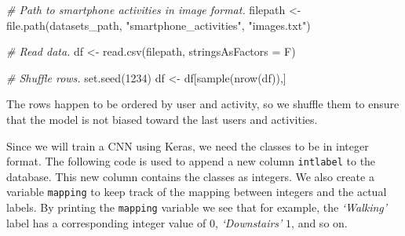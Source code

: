 \documentclass[
  11pt,
]{krantz}
\newenvironment{Shaded}{\begin{snugshade}}{\end{snugshade}}
\newcommand{\AttributeTok}[1]{\textcolor[rgb]{0.61,0.61,0.61}{#1}}
\newcommand{\CommentTok}[1]{\textcolor[rgb]{0.37,0.37,0.37}{\textit{#1}}}
\newcommand{\DecValTok}[1]{\textcolor[rgb]{0.06,0.06,0.06}{#1}}
\newcommand{\DocumentationTok}[1]{\textcolor[rgb]{0.37,0.37,0.37}{\textbf{\textit{#1}}}}
\newcommand{\FunctionTok}[1]{\textcolor[rgb]{0,0,0}{#1}}
\newcommand{\NormalTok}[1]{#1}
\newcommand{\OtherTok}[1]{\textcolor[rgb]{0.37,0.37,0.37}{#1}}
\newcommand{\SpecialCharTok}[1]{\textcolor[rgb]{0,0,0}{#1}}
\newcommand{\StringTok}[1]{\textcolor[rgb]{0.5,0.5,0.5}{#1}}
\begin{document}
\begin{Shaded}
\begin{Highlighting}[]
\CommentTok{\# Path to smartphone activities in image format.}
\NormalTok{filepath }\OtherTok{\textless{}{-}} \FunctionTok{file.path}\NormalTok{(datasets\_path,}
                      \StringTok{"smartphone\_activities"}\NormalTok{,}
                      \StringTok{"images.txt"}\NormalTok{)}

\CommentTok{\# Read data.}
\NormalTok{df }\OtherTok{\textless{}{-}} \FunctionTok{read.csv}\NormalTok{(filepath, }\AttributeTok{stringsAsFactors =}\NormalTok{ F)}

\CommentTok{\# Shuffle rows.}
\FunctionTok{set.seed}\NormalTok{(}\DecValTok{1234}\NormalTok{)}
\NormalTok{df }\OtherTok{\textless{}{-}}\NormalTok{ df[}\FunctionTok{sample}\NormalTok{(}\FunctionTok{nrow}\NormalTok{(df)),]}
\end{Highlighting}
\end{Shaded}

The rows happen to be ordered by user and activity, so we shuffle them to ensure that the model is not biased toward the last users and activities.

Since we will train a CNN using Keras, we need the classes to be in integer format. The following code is used to append a new column \texttt{intlabel} to the database. This new column contains the classes as integers. We also create a variable \texttt{mapping} to keep track of the mapping between integers and the actual labels. By printing the \texttt{mapping} variable we see that for example, the \emph{`Walking'} label has a corresponding integer value of \(0\), \emph{`Downstairs'} \(1\), and so on.

\begin{Shaded}
\end{Shaded}
\end{document}

